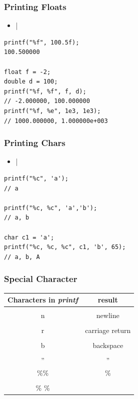 \documentclass{../c-lecture}
\begin{document}
\begin{frame}[fragile]
  \frametitle{Printing Floats}
  \begin{itemize}
    \item {}|%
  \end{itemize}
  \begin{verbatim}
printf("%f", 100.5f);
100.500000

float f = -2;
double d = 100;
printf("%f, %f", f, d);
// -2.000000, 100.000000
printf("%f, %e", 1e3, 1e3);
// 1000.000000, 1.000000e+003
  \end{verbatim}
\end{frame}

\begin{frame}[fragile]
  \frametitle{Printing Chars}
  \begin{itemize}
    \item {}|%
  \end{itemize}
  \begin{verbatim}
printf("%c", 'a');
// a

printf("%c, %c", 'a','b');
// a, b

char c1 = 'a';
printf("%c, %c, %c", c1, 'b', 65);
// a, b, A
  \end{verbatim}
\end{frame}

\begin{frame}
  \frametitle{Special Character}
  \begin{table}
  \begin{tabular}{cc}
    \toprule

    Characters in \textit{\color{Orange} printf} &
    result \\

    \midrule

    \\n &
    newline \\

    \midrule

    \\r &
    carriage return \\

    \midrule

    \\b &
    backspace \\

    \midrule

    \\'' &
    '' \\

    \midrule

    \%\% &
    \% \\

    \midrule

    \\\%
    \%
  \end{tabular}
  \end{table}
\end{frame}
\end{document}

